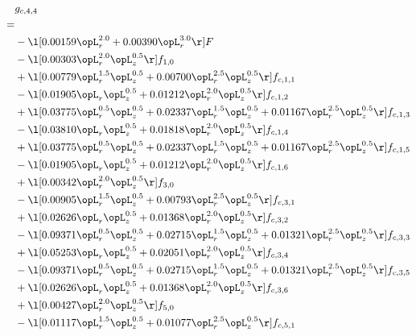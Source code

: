 \begin{alignat}{2} 
\label{eq:g_44_0} 
& g_{c,4,4} \nonumber \\ 
 = \\ 
& - \l[  0.00159 \opL_r^{2.0} +  0.00390 \opL_r^{3.0}  \r] F \nonumber \\ 
& - \l[  0.00303 \opL_r^{2.0} \opL_z^{0.5}  \r] f_{1,0} \nonumber \\ 
& + \l[  0.00779 \opL_r^{1.5} \opL_z^{0.5} +  0.00700 \opL_r^{2.5} \opL_z^{0.5}  \r] f_{c,1,1} \nonumber \\ 
& - \l[  0.01905 \opL_r \opL_z^{0.5} +  0.01212 \opL_r^{2.0} \opL_z^{0.5}  \r] f_{c,1,2} \nonumber \\ 
& + \l[  0.03775 \opL_r^{0.5} \opL_z^{0.5} +  0.02337 \opL_r^{1.5} \opL_z^{0.5} +  0.01167 \opL_r^{2.5} \opL_z^{0.5}  \r] f_{c,1,3} \nonumber \\ 
& - \l[  0.03810 \opL_r \opL_z^{0.5} +  0.01818 \opL_r^{2.0} \opL_z^{0.5}  \r] f_{c,1,4} \nonumber \\ 
& + \l[  0.03775 \opL_r^{0.5} \opL_z^{0.5} +  0.02337 \opL_r^{1.5} \opL_z^{0.5} +  0.01167 \opL_r^{2.5} \opL_z^{0.5}  \r] f_{c,1,5} \nonumber \\ 
& - \l[  0.01905 \opL_r \opL_z^{0.5} +  0.01212 \opL_r^{2.0} \opL_z^{0.5}  \r] f_{c,1,6} \nonumber \\ 
& + \l[  0.00342 \opL_r^{2.0} \opL_z^{0.5}  \r] f_{3,0} \nonumber \\ 
& - \l[  0.00905 \opL_r^{1.5} \opL_z^{0.5} +  0.00793 \opL_r^{2.5} \opL_z^{0.5}  \r] f_{c,3,1} \nonumber \\ 
& + \l[  0.02626 \opL_r \opL_z^{0.5} +  0.01368 \opL_r^{2.0} \opL_z^{0.5}  \r] f_{c,3,2} \nonumber \\ 
& - \l[  0.09371 \opL_r^{0.5} \opL_z^{0.5} +  0.02715 \opL_r^{1.5} \opL_z^{0.5} +  0.01321 \opL_r^{2.5} \opL_z^{0.5}  \r] f_{c,3,3} \nonumber \\ 
& + \l[  0.05253 \opL_r \opL_z^{0.5} +  0.02051 \opL_r^{2.0} \opL_z^{0.5}  \r] f_{c,3,4} \nonumber \\ 
& - \l[  0.09371 \opL_r^{0.5} \opL_z^{0.5} +  0.02715 \opL_r^{1.5} \opL_z^{0.5} +  0.01321 \opL_r^{2.5} \opL_z^{0.5}  \r] f_{c,3,5} \nonumber \\ 
& + \l[  0.02626 \opL_r \opL_z^{0.5} +  0.01368 \opL_r^{2.0} \opL_z^{0.5}  \r] f_{c,3,6} \nonumber \\ 
& + \l[  0.00427 \opL_r^{2.0} \opL_z^{0.5}  \r] f_{5,0} \nonumber \\ 
& - \l[  0.01117 \opL_r^{1.5} \opL_z^{0.5} +  0.01077 \opL_r^{2.5} \opL_z^{0.5}  \r] f_{c,5,1} \nonumber \\ 

\end{alignat}
